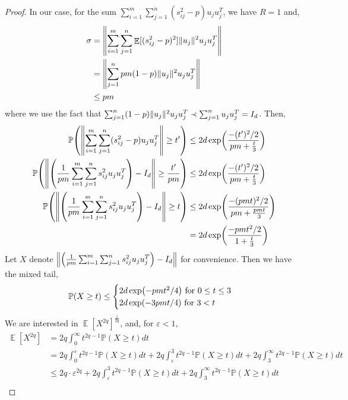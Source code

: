 \documentclass[11pt]{amsart}
\numberwithin{equation}{section}
\numberwithin{equation}{section}
\DeclareMathOperator{\E}{\mathbb{E}}
\def \P {\mathbb{P}}
\DeclarePairedDelimiter{\norm}{\lVert}{\rVert}
\DeclarePairedDelimiter{\paren}{(}{)}
\theoremstyle{remark}
\theoremstyle{definition}
\begin{document}
\begin{proof}
    In our case, for the sum $\sum_{i=1}^m \sum_{j =1}^n (s_{ij}^2 - p)u_ju_{j}^T$, we have $R = 1$ and,
    \begin{align*}
        \sigma &= \norm*{\sum_{i=1}^m \sum_{j =1}^n \E[(s_{ij}^2 - p)^2] \norm{u_j}^2u_ju_{j}^T } \\
        &= \norm*{\sum_{j =1}^n pm(1-p) \norm{u_j}^2u_ju_{j}^T } \\  
        &\le pm
    \end{align*}
    where we use the fact that $\sum_{j =1}^n (1-p) \norm{u_j}^2u_ju_{j}^T \prec \sum_{j =1}^n  u_ju_{j}^T = I_d$. Then,
    \begin{align*}
        \P \paren*{ \norm*{\sum_{i=1}^m \sum_{j =1}^n (s_{ij}^2 - p)u_ju_{j}^T} \ge t' } &\le 2d \exp \paren*{\frac{-(t')^2/2}{pm + \frac{t}{3}}} \\
        \P \paren*{ \norm*{\paren*{\frac{1}{pm}\sum_{i=1}^m \sum_{j =1}^n s_{ij}^2u_ju_{j}^T} -  I_d } \ge \frac{t'}{pm} } &\le 2d \exp \paren*{\frac{-(t')^2/2}{pm + \frac{t}{3}}} \\
        \P \paren*{ \norm*{ \paren*{\frac{1}{pm}\sum_{i=1}^m \sum_{j =1}^n s_{ij}^2u_ju_{j}^T} -  I_d } \ge t } &\le 2d \exp \paren*{\frac{-(pmt)^2/2}{pm + \frac{pmt}{3}}} \\
        &= 2d \exp \paren*{\frac{-pmt^2/2}{1 + \frac{t}{3}}} \\
    \end{align*}
    Let $X$ denote $\norm*{\paren*{\frac{1}{pm}\sum_{i=1}^m \sum_{j =1}^n s_{ij}^2u_ju_{j}^T} -  I_d}$ for convenience. Then we have the mixed tail,
    \begin{align*}
        \P(X \ge t) \le \begin{cases}
            2d \exp \paren*{-pmt^2/4} \text{ for } 0 \le t \le 3\\
            2d \exp \paren*{-3pmt/4} \text{ for } 3 < t\\
        \end{cases}
    \end{align*}
    We are interested in $\E[X^{2q}]^\frac{1}{2q}$, and, for $\varepsilon < 1$,
    \begin{align*}
        \E[X^{2q}] &= 2q \int_0^\infty t^{2q-1} \P(X \ge t) dt \\
        &= 2q \int_0^\varepsilon t^{2q-1} \P(X \ge t) dt + 2q \int_\varepsilon^3 t^{2q-1} \P(X \ge t) dt + 2q \int_3^\infty t^{2q-1} \P(X \ge t) dt \\
        &\le 2q \cdot \varepsilon^{2q} + 2q \int_\varepsilon^3 t^{2q-1} \P(X \ge t) dt + 2q \int_3^\infty t^{2q-1} \P(X \ge t) dt \\

\end{align*}
\end{proof}
\end{document}
